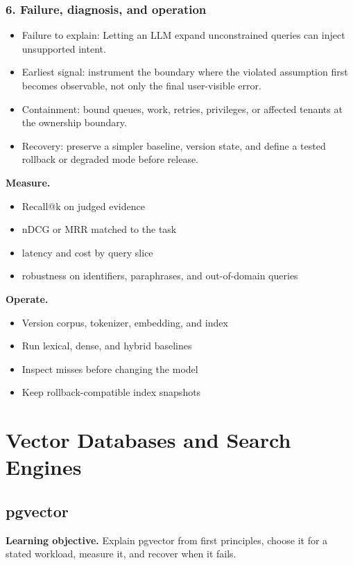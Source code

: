 \subsubsection*{6. Failure, diagnosis, and operation}
\begin{itemize}
\item Failure to explain: Letting an LLM expand unconstrained queries can inject unsupported intent.
\item Earliest signal: instrument the boundary where the violated assumption first becomes observable, not only the final user-visible error.
\item Containment: bound queues, work, retries, privileges, or affected tenants at the ownership boundary.
\item Recovery: preserve a simpler baseline, version state, and define a tested rollback or degraded mode before release.
\end{itemize}
\textbf{Measure.}\begin{itemize}
\item Recall@k on judged evidence
\item nDCG or MRR matched to the task
\item latency and cost by query slice
\item robustness on identifiers, paraphrases, and out-of-domain queries
\end{itemize}
\textbf{Operate.}\begin{itemize}
\item Version corpus, tokenizer, embedding, and index
\item Run lexical, dense, and hybrid baselines
\item Inspect misses before changing the model
\item Keep rollback-compatible index snapshots
\end{itemize}
\clearpage\section{Vector Databases and Search Engines}
\subsection{pgvector}
\textbf{Learning objective.} Explain pgvector from first principles, choose it for a stated workload, measure it, and recover when it fails.
